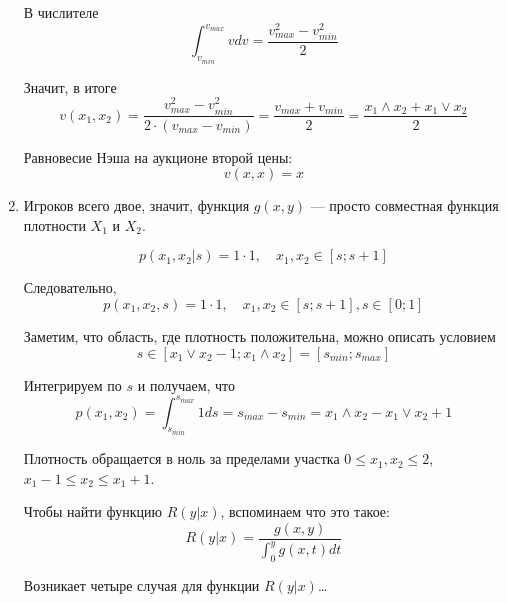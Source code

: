 \begin{enumerate}
В числителе
\begin{equation}
\int_{v_{min}}^{v_{max}}vdv=\frac{v_{max}^{2}-v_{min}^{2}}{2}
\end{equation}

Значит, в итоге
\begin{equation}
v(x_{1},x_{2})=\frac{v_{max}^{2}-v_{min}^{2}}{2\cdot (v_{max}-v_{min})}=\frac{v_{max}+v_{min}}{2}= \frac{x_{1}\wedge x_{2}+x_{1}\vee x_{2}}{2}
\end{equation}

Равновесие Нэша на аукционе второй цены:
\begin{equation}
v(x,x)=x
\end{equation}


\item Игроков всего двое, значит, функция $ g(x,y) $ — просто совместная функция плотности $ X_{1} $ и $ X_{2} $.

\begin{equation}
p(x_{1},x_{2}|s)=1\cdot 1, \quad x_{1},x_{2}\in [s;s+1]
\end{equation}

Следовательно,
\begin{equation}
p(x_{1},x_{2},s)=1\cdot 1, \quad x_{1},x_{2}\in [s;s+1], s\in [0;1]
\end{equation}

Заметим, что область, где плотность положительна, можно описать условием
\begin{equation}
s\in [x_{1}\vee x_{2}-1; x_{1}\wedge x_{2}]=[s_{min};s_{max}]
\end{equation}

Интегрируем по $ s $ и получаем, что
\begin{equation}
p(x_{1},x_{2})=\int_{s_{min}}^{s_{max}} 1 ds= s_{max}-s_{min}=x_{1}\wedge x_{2}-x_{1}\vee x_{2}+1
\end{equation}

Плотность обращается в ноль за пределами участка $ 0\leq x_{1},x_{2}\leq 2 $, $ x_{1}-1\leq x_{2} \leq x_{1}+1 $.

Чтобы найти функцию $ R(y|x) $, вспоминаем что это такое:
\begin{equation}
R(y|x)=\frac{g(x,y)}{\int_{0}^{y}g(x,t)dt}
\end{equation}

Возникает четыре случая для функции $ R(y|x) $\ldots



\end{enumerate}
